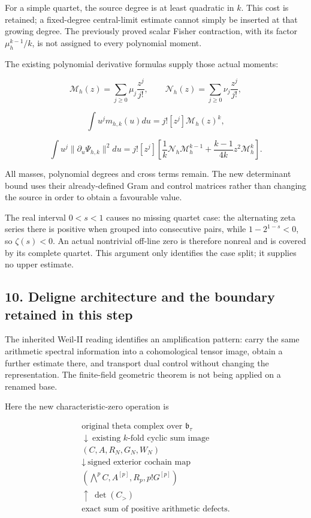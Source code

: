 For a simple quartet, the source degree is at least quadratic in \(k\).
This cost is retained; a fixed-degree central-limit estimate cannot
simply be inserted at that growing degree. The previously proved scalar
Fisher contraction, with its factor \(\mu_h^{k-1}/k\), is not assigned
to every polynomial moment.

The existing polynomial derivative formulas supply those actual moments:

\[
\mathcal M_h(z)=\sum_{j\geq0}\mu_j\frac{z^j}{j!},\qquad
\mathcal N_h(z)=\sum_{j\geq0}\nu_j\frac{z^j}{j!},
\]

\[
\int u^j m_{h,k}(u)du=j![z^j]\mathcal M_h(z)^k,
\]

\[
\int u^j\|\partial_u\Psi_{h,k}\|^2du
=j![z^j]\left[
\frac1k\mathcal N_h\mathcal M_h^{k-1}
+\frac{k-1}{4k}z^2\mathcal M_h^k\right].
\]

All masses, polynomial degrees and cross terms remain. The new
determinant bound uses their already-defined Gram and control matrices
rather than changing the source in order to obtain a favourable value.

The real interval \(0<s<1\) causes no missing quartet case: the
alternating zeta series there is positive when grouped into consecutive
pairs, while \(1-2^{1-s}<0\), so \(\zeta(s)<0\). An actual nontrivial
off-line zero is therefore nonreal and is covered by its complete
quartet. This argument only identifies the case split; it supplies no
upper estimate.

\subsection{10. Deligne architecture and the boundary retained in this
step}\label{exterior_trace:deligne-architecture-and-the-boundary-retained-in-this-step}

The inherited Weil-II reading identifies an amplification pattern: carry
the same arithmetic spectral information into a cohomological tensor
image, obtain a further estimate there, and transport dual control
without changing the representation. The finite-field geometric theorem
is not being applied on a renamed base.

Here the new characteristic-zero operation is

\[
\begin{gathered}
\text{original theta complex over }\mathfrak b_\tau\\
\downarrow\ \text{existing }k\text{-fold cyclic sum image}\\
(C,A,R_N,G_N,W_N)\\
\downarrow\ \text{signed exterior cochain map}\\
(\bigwedge^p C,A^{[p]},R_p,p!G^{[p]})\\
\uparrow\ \det(C_{>})\\
\text{exact sum of positive arithmetic defects}.
\end{gathered}
\]

